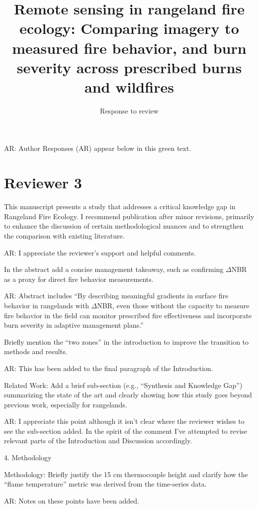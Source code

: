 \documentclass[parskip=half, american]{scrartcl}
\title{\Large Remote sensing in rangeland fire ecology: Comparing imagery to measured fire behavior, and burn severity across prescribed burns and wildfires  }
\subtitle{Response to review}
\author{ }
\date{}
\newcommand{\AR}[1]
	{\color{PineGreen}AR: #1\color{black} \par }
\begin{document}
\maketitle

\vspace{-2cm} 

\AR{Author Responses (AR) appear below in this green text.}

\section*{Reviewer 3}

This manuscript presents a study that addresses a critical knowledge gap in Rangeland Fire Ecology. I recommend publication after minor revisions, primarily to enhance the discussion of certain methodological nuances and to strengthen the comparison with existing literature.

\AR{I appreciate the reviewer's support and helpful comments.  }

In the abstract add a concise management takeaway, such as confirming $\Delta$NBR as a proxy for direct fire behavior measurements.

\AR{ Abstract includes ``By describing meaningful gradients in surface fire behavior in rangelands with $\Delta$NBR, even those without the capacity to measure fire behavior in the field can monitor prescribed fire effectiveness and incorporate burn severity in adaptive management plans.'' }

Briefly mention the ``two zones'' in the introduction to improve the transition to methods and results.

\AR{This has been added to the final paragraph of the Introduction.  }

Related Work: Add a brief sub-section (e.g., ``Synthesis and Knowledge Gap'') summarizing the state of the art and clearly showing how this study goes beyond previous work, especially for rangelands. 

\AR{I appreciate this point although it isn't clear where the reviewer wishes to see the sub-section added.
In the spirit of the comment I've attempted to revise relevant parts of the Introduction and Discussion accordingly.  }

4. Methodology

Methodology: Briefly justify the 15 cm thermocouple height and clarify how the ``flame temperature'' metric was derived from the time-series data.

\AR{Notes on these points have been added.  } 
\end{document}
